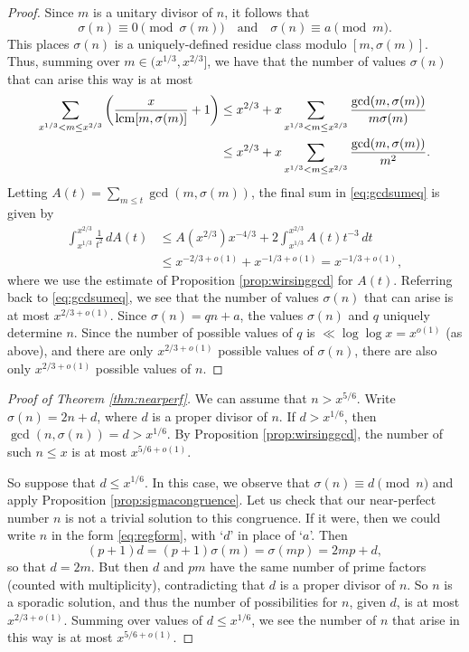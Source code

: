 \documentclass[12pt]{amsart}
\begin{document}
\begin{proof}
Since $m$ is a unitary divisor of $n$, it follows that
\[ \sigma(n) \equiv 0\pmod{\sigma(m)} \quad\text{and}\quad \sigma(n)\equiv a\pmod{m}.\]
This places $\sigma(n)$ is a uniquely-defined residue class modulo $[m,\sigma(m)]$. Thus, summing over $m \in (x^{1/3}, x^{2/3}]$, we have that the number of values $\sigma(n)$ that can arise this way is at most
\begin{align}\notag \sum_{x^{1/3} < m \leq x^{2/3}} \left(\frac{x}{\mathrm{lcm}[m,\sigma(m)]} + 1\right) &\leq x^{2/3} + x \sum_{x^{1/3} < m \leq x^{2/3}}\frac{\gcd(m,\sigma(m))}{m\sigma(m)} \\
	&\leq x^{2/3} + x  \sum_{x^{1/3} < m \leq x^{2/3}} \frac{\gcd(m,\sigma(m))}{m^2}. \label{eq:gcdsumeq}\end{align}
Letting $A(t) = \sum_{m \leq t} \gcd(m,\sigma(m))$, the final sum in \eqref{eq:gcdsumeq} is given by
\begin{align*} \int_{x^{1/3}}^{x^{2/3}} \frac{1}{t^2}\, dA(t)&\leq A(x^{2/3}) x^{-4/3} + 2 \int_{x^{1/3}}^{x^{2/3}} A(t) t^{-3}\, dt \\
	&\leq x^{-2/3 + o(1)} + x^{-1/3+o(1)} = x^{-1/3+o(1)},   \end{align*}
where we use the estimate of Proposition \ref{prop:wirsinggcd} for $A(t)$. Referring back to \eqref{eq:gcdsumeq}, we see that the number of values $\sigma(n)$ that can arise is at most $x^{2/3+o(1)}$. Since $\sigma(n)=qn+a$, the values $\sigma(n)$ and $q$ uniquely determine $n$. Since the number of possible values of $q$ is $\ll \log\log{x} = x^{o(1)}$ (as above), and there are only $x^{2/3+o(1)}$ possible values of $\sigma(n)$, there are also only $x^{2/3+o(1)}$ possible values of $n$.
\end{proof}

\begin{proof}[Proof of Theorem \ref{thm:nearperf}] We can assume that $n > x^{5/6}$. Write $\sigma(n) = 2n+d$, where 
	$d$ is a proper divisor of $n$. If  $d > x^{1/6}$, then $\gcd(n,\sigma(n)) =d > x^{1/6}$. By Proposition \ref{prop:wirsinggcd}, the number of such $n\leq x$ is at most $x^{5/6+o(1)}$. 
	
So suppose that $d \leq x^{1/6}$. In this case, we observe that $\sigma(n)\equiv d\pmod{n}$ and apply Proposition \ref{prop:sigmacongruence}. Let us check that our near-perfect number $n$ is not a trivial solution to this congruence. If it were, then we could write $n$ in the form \eqref{eq:regform}, with `$d$' in place of `$a$'. Then
	\[ (p+1)d= (p+1)\sigma(m) = \sigma(mp) = 2mp + d, \]
so that $d=2m$. But then $d$ and $pm$ have the same number of prime factors (counted with multiplicity), contradicting that $d$ is a proper divisor of $n$. So $n$ is a sporadic solution, and thus the number of possibilities for $n$, given $d$, is at most $x^{2/3+o(1)}$. Summing over values of $d\leq x^{1/6}$, we see the number of $n$ that arise in this way is at most $x^{5/6+o(1)}$.
\end{proof} 
\end{document}

